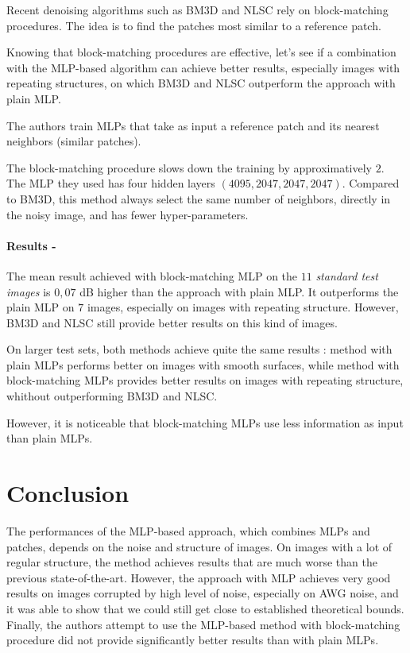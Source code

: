 \documentclass[10pt,a4paper]{article}
\newcommand{\ourparagraph}[1]{\paragraph{#1}}
\begin{document}
{Recent denoising algorithms such as BM3D and NLSC rely on block-matching procedures. The idea is to find the patches most similar to a reference patch.

Knowing that block-matching procedures are effective, let's see if a combination with the MLP-based algorithm can achieve better results, especially images with repeating structures, on which BM3D and NLSC outperform the approach with plain MLP.

The authors train MLPs that take as input a reference patch and its nearest neighbors (similar patches).

The block-matching procedure slows down the training by approximatively $2$. The MLP they used has four hidden layers $(4095, 2047, 2047, 2047)$. Compared to BM3D, this method always select the same number of neighbors, directly in the noisy image, and has fewer hyper-parameters.

\ourparagraph{Results -}{
The mean result achieved with block-matching MLP on the $11$ \textit{standard test images} is $0,07$ dB higher than the approach with plain MLP. It outperforms the plain MLP on $7$ images, especially on images with repeating structure. However, BM3D and NLSC still provide better results on this kind of images.

On larger test sets, both methods achieve quite the same results : method with plain MLPs performs better on images with smooth surfaces, while method with block-matching MLPs provides better results on images with repeating structure, whithout outperforming BM3D and NLSC.

However, it is noticeable that block-matching MLPs use less information as input than plain MLPs.}

\section{Conclusion}

The performances of the MLP-based approach, which combines MLPs and patches, depends on the noise and structure of images. On images with a lot of regular structure, the method achieves results that are much worse than the previous state-of-the-art. However, the approach with MLP achieves very good results on images corrupted by high level of noise, especially on AWG noise, and it was able to show that we could still get close to established theoretical bounds.
Finally, the authors attempt to use the MLP-based method with block-matching procedure did not provide significantly better results than with plain MLPs.

}
\end{document}
